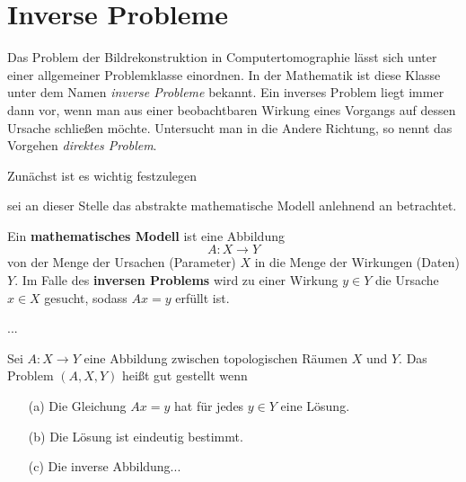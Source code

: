 \chapter{Inverse Probleme}
\label{cha:inverse_Probleme}

Das Problem der Bildrekonstruktion in Computertomographie lässt sich unter einer allgemeiner Problemklasse einordnen. In der Mathematik ist diese Klasse unter dem Namen \textit{inverse Probleme} bekannt. Ein inverses Problem liegt immer dann vor, wenn man aus einer beobachtbaren Wirkung eines Vorgangs auf dessen Ursache schließen möchte. Untersucht man in die Andere Richtung, so nennt das Vorgehen \textit{direktes Problem}.

Zunächst ist es wichtig festzulegen 

sei an dieser Stelle das abstrakte mathematische Modell anlehnend an \cite[Kap.\ 1.5]{Rieder03} betrachtet.
\begin{Definition}
	Ein \textbf{mathematisches Modell} ist eine Abbildung
	\[A: X \rightarrow Y\]
	von der Menge der Ursachen (Parameter) $X$ in die Menge der Wirkungen (Daten) $Y$. Im Falle des \textbf{inversen Problems} wird zu einer Wirkung $y \in Y$ die Ursache $x \in X$ gesucht, sodass $Ax = y$ erfüllt ist.
\end{Definition}
...
\begin{Definition}
	Sei $A:X \rightarrow Y$ eine Abbildung zwischen topologischen Räumen $X$ und $Y$. Das Problem $(A, X, Y)$ heißt gut gestellt wenn
	\begin{itemize}
		\item[(a)] Die Gleichung $Ax = y$ hat für jedes $y \in Y$ eine Lösung.
		\item[(b)] Die Lösung ist eindeutig bestimmt.
		\item[(c)] Die inverse Abbildung...
	\end{itemize}
\end{Definition}
